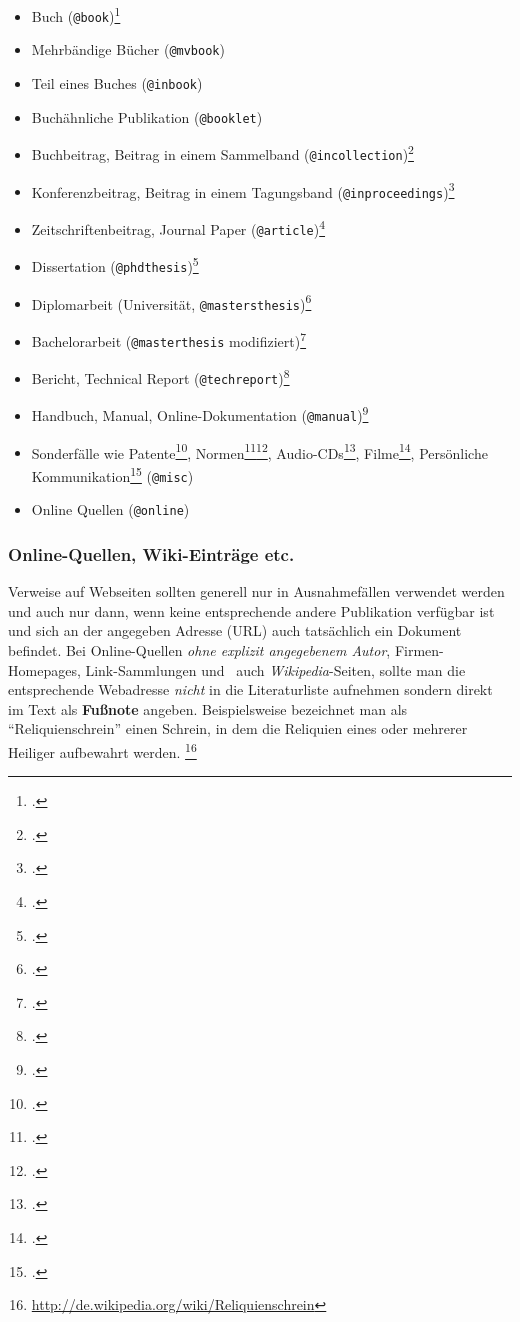 \begin{itemize}
\item Buch (\texttt{@book})\footcite{BurgerBurge06}
\item Mehrbändige Bücher (\texttt{@mvbook})
\item Teil eines Buches (\texttt{@inbook})
\item Buchähnliche Publikation (\texttt{@booklet}) 
\item Buchbeitrag, Beitrag in einem Sammelband (\texttt{@incollection})\footcite{Ears99}
\item Konferenzbeitrag, Beitrag in einem Tagungsband (\texttt{@inproceedings})\footcite{Burger87}
\item Zeitschriftenbeitrag, Journal Paper (\texttt{@article})\footcite{Guttman01}
\item Dissertation (\texttt{@phdthesis})\footcite{Eberl87}
\item Diplomarbeit (Universität, \texttt{@mastersthesis})\footcite{Wintersberger00}
\item Bachelorarbeit (\texttt{@masterthesis} modifiziert)\footcite{Bacher04}
\item Bericht, Technical Report (\texttt{@techreport})\footcite{Beeler48}
\item Handbuch, Manual, Online-Dokumentation (\texttt{@manual})\footcite{Microsoft01}
\item Sonderfälle wie \zB Patente\footcite{PAT07}, Normen\footcite{DIN9241-11}\footcite{DIN9241-110}, Audio-CDs\footcite{Zappa95}, Filme\footcite{Nosferatu}, Persönliche Kommunikation\footcite{Kreisky75} (\texttt{@misc})
\item Online Quellen (\texttt{@online})
\end{itemize}

\subsubsection{Online-Quellen, Wiki-Einträge etc.}
\label{sec:OnlineQuellen}


Verweise auf Webseiten sollten generell nur in Ausnahmefällen
verwendet werden und auch nur dann, wenn keine entsprechende
andere Publikation verfügbar ist und sich an der angegeben Adresse
(URL) auch tatsächlich ein Dokument befindet. Bei Online-Quellen 
\emph{ohne explizit angegebenem Autor}, \zB Firmen-Homepages, 
Link-Sammlungen und \va\ auch \emph{Wikipedia}-Seiten, sollte 
man die entsprechende Webadresse \emph{nicht} in die
Literaturliste aufnehmen sondern direkt im Text als \textbf{Fußnote} 
angeben. Beispielsweise bezeichnet man als "`Reliquienschrein"' einen 
Schrein, in dem die Reliquien eines oder mehrerer Heiliger aufbewahrt werden.%
\footnote{\url{http://de.wikipedia.org/wiki/Reliquienschrein}}

